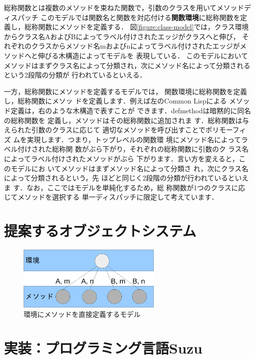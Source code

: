 \documentclass[a4paper,11pt,dvipdfmx]{jreport}
\begin{document}
総称関数とは複数のメソッドを束ねた関数で，引数のクラスを用いてメソッドディスパッチ
このモデルでは関数名と関数を対応付ける\textbf{関数環境}に総称関数を定義し，総称関数にメソッドを定義する．
図\ref{figure:class-model}では，クラス環境からクラス名AおよびBによってラベル付けされたエッジがクラスへと伸び，
それぞれのクラスからメソッド名mおよびnによってラベル付けされたエッジがメソッドへと伸びる木構造によってモデルを
表現している．
このモデルにおいてメソッドはまずクラス名によって分類され，次にメソッド名によって分類されるという2段階の分類が
行われているといえる．

一方，総称関数にメソッドを定義するモデルでは，
関数環境に総称関数を定義し，総称関数にメソッ
ドを定義します．例えば左のCommon Lispによる
メソッド定義は，右のような木構造で表すことが
できます．defmethodは暗黙的に同名の総称関数を
定義し，メソッドはその総称関数に追加されま
す．総称関数は与えられた引数のクラスに応じて
適切なメソッドを呼び出すことでポリモーフィズ
ムを実現します．つまり，トップレベルの関数環
境にメソッド名によってラベル付けされた総称関
数がぶら下がり，それぞれの総称関数に引数のク
ラス名によってラベル付けされたメソッドがぶら
下がります．言い方を変えると，このモデルにお
いてメソッドはまずメソッド名によって分類さ
れ，次にクラス名によって分類されるという，先
ほどと同じく2段階の分類が行われているといえま
す．なお，ここではモデルを単純化するため，総
称関数が1つのクラスに応じてメソッドを選択する
単一ディスパッチに限定して考えています．


\chapter{提案するオブジェクトシステム}

\begin{figure}[htbp]
	\centering
	\includegraphics[width=7cm]{fig/trees_containerless-crop.pdf}
	\caption{環境にメソッドを直接定義するモデル}
	\label{figure:containerlsss-model}
\end{figure}


\chapter{実装：プログラミング言語Suzu}
\end{document}

